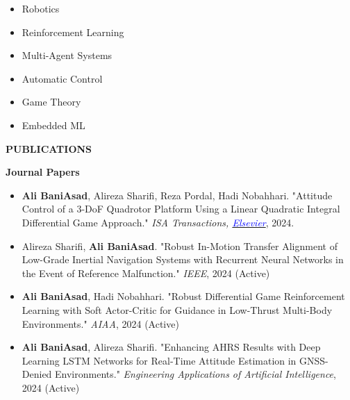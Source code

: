 \documentclass[12pt]{article}
\begin{document}
\begin{multicols}{3}
	\begin{itemize}
		\item Robotics
		\item Reinforcement Learning
		\item Multi-Agent Systems
		\item Automatic Control
		\item Game Theory
		\item Embedded ML
	\end{itemize}
\end{multicols}



\vspace{0.1in} %

\begin{center}
	{\noindent \bfseries PUBLICATIONS}
\end{center}

\vspace{8pt} %


\noindent
{\bfseries Journal Papers}
\vspace{6pt}


\begin{itemize} \itemsep -2pt %
	\item \textbf{Ali BaniAsad}, Alireza Sharifi, Reza Pordal, Hadi Nobahhari. "Attitude Control of a 3-DoF Quadrotor Platform Using a Linear Quadratic Integral Differential Game Approach." \textit{ISA Transactions, 
        \href{https://doi.org/10.1016/j.isatra.2024.03.005}{\textcolor{blue}{Elsevier}}}, 2024.
	\item Alireza Sharifi, \textbf{Ali BaniAsad}. "Robust In-Motion Transfer Alignment of Low-Grade Inertial Navigation Systems with Recurrent Neural Networks in the Event of Reference Malfunction." \textit{IEEE}, 2024 (Active)
	\item \textbf{Ali BaniAsad}, Hadi Nobahhari. "Robust Differential Game Reinforcement Learning with Soft Actor-Critic for Guidance in Low-Thrust Multi-Body Environments." \textit{AIAA}, 2024 (Active)
	\item \textbf{Ali BaniAsad}, Alireza Sharifi. "Enhancing AHRS Results with Deep Learning LSTM Networks for Real-Time Attitude Estimation in GNSS-Denied Environments." \textit{Engineering Applications of Artificial Intelligence}, 2024 (Active) 
\end{itemize}
\end{document}

